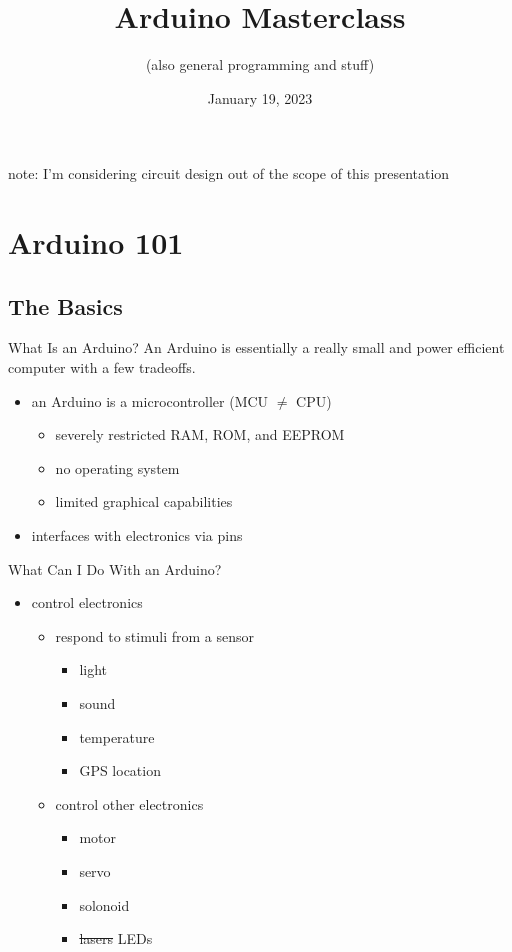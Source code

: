 \documentclass{beamer}
\title{Arduino Masterclass}
\subtitle{(also general programming and stuff)}
\date{January 19, 2023}
\begin{document}
	\begin{frame}
		\titlepage
	\end{frame}

	\begin{frame}
		note: I'm considering circuit design out of the scope of this presentation
		\tableofcontents
	\end{frame}

	\section{Arduino 101}
	\subsection{The Basics}
	\begin{frame}{What Is an Arduino?}
		An Arduino is essentially a really small and power efficient computer with a few tradeoffs.

		\begin{itemize}
			\item an Arduino is a microcontroller (MCU $\neq$ CPU)
			\begin{itemize}
				\item severely restricted RAM, ROM, and EEPROM
				\item no operating system
				\item limited graphical capabilities
			\end{itemize}
			\item interfaces with electronics via pins
		\end{itemize}
	\end{frame}

	\begin{frame}{What Can I Do With an Arduino?}
		\begin{itemize}
			\item control electronics
			\begin{itemize}
				\item respond to stimuli from a sensor
				\begin{itemize}
					\item light
					\item sound
					\item temperature
					\item GPS location
				\end{itemize}

				\item control other electronics
				\begin{itemize}
					\item motor
					\item servo
					\item solonoid
					\item \sout{lasers} LEDs
				\end{itemize}
			\end{itemize}
		\end{itemize}
	\end{frame}
\end{document}
